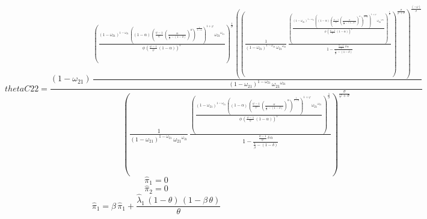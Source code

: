 \begin{dmath*}
thetaC22 = \frac{\left(1-{{\omega_{21}}}\right)\, \frac{\left(\frac{\left(1-{{\omega_{21}}}\right)^{1-{{\omega_{21}}}}\, \left(\left(1-{{\alpha}}\right)\, \left(\frac{{{\psi}}-1}{{{\psi}}}\, \left(\frac{{{\alpha}}}{\frac{1}{{{\beta}}}-\left(1-{{\delta}}\right)}\right)^{{{\alpha}}}\right)^{\frac{1}{1-{{\alpha}}}}\right)^{1+{{\varphi}}}\, {{\omega_{21}}}^{{{\omega_{21}}}}}{{{\phi}}\, \left(\frac{{{\psi}}-1}{{{\psi}}}\, \left(1-{{\alpha}}\right)\right)^{{{\varphi}}}}\right)^{\frac{1}{{{\sigma}}}}\, \left(\left(\frac{1}{\left(1-{{\omega_{21}}}\right)^{1-{{\omega_{21}}}}\, {{\omega_{21}}}^{{{\omega_{21}}}}}\, \frac{\left(\frac{\left(1-{{\omega_{21}}}\right)^{1-{{\omega_{21}}}}\, \left(\left(1-{{\alpha}}\right)\, \left(\frac{{{\psi}}-1}{{{\psi}}}\, \left(\frac{{{\alpha}}}{\frac{1}{{{\beta}}}-\left(1-{{\delta}}\right)}\right)^{{{\alpha}}}\right)^{\frac{1}{1-{{\alpha}}}}\right)^{1+{{\varphi}}}\, {{\omega_{21}}}^{{{\omega_{21}}}}}{{{\phi}}\, \left(\frac{{{\psi}}-1}{{{\psi}}}\, \left(1-{{\alpha}}\right)\right)^{{{\varphi}}}}\right)^{\frac{1}{{{\sigma}}}}}{1-\frac{\frac{{{\psi}}-1}{{{\psi}}}\, {{\delta}}\, {{\alpha}}}{\frac{1}{{{\beta}}}-\left(1-{{\delta}}\right)}}\right)^{\frac{{{\sigma}}}{{{\varphi}}+{{\sigma}}}}\right)^{\frac{\left(-{{\varphi}}\right)}{{{\sigma}}}}}{\left(1-{{\omega_{21}}}\right)^{1-{{\omega_{21}}}}\, {{\omega_{21}}}^{{{\omega_{21}}}}}}{\left(\frac{1}{\left(1-{{\omega_{21}}}\right)^{1-{{\omega_{21}}}}\, {{\omega_{21}}}^{{{\omega_{21}}}}}\, \frac{\left(\frac{\left(1-{{\omega_{21}}}\right)^{1-{{\omega_{21}}}}\, \left(\left(1-{{\alpha}}\right)\, \left(\frac{{{\psi}}-1}{{{\psi}}}\, \left(\frac{{{\alpha}}}{\frac{1}{{{\beta}}}-\left(1-{{\delta}}\right)}\right)^{{{\alpha}}}\right)^{\frac{1}{1-{{\alpha}}}}\right)^{1+{{\varphi}}}\, {{\omega_{21}}}^{{{\omega_{21}}}}}{{{\phi}}\, \left(\frac{{{\psi}}-1}{{{\psi}}}\, \left(1-{{\alpha}}\right)\right)^{{{\varphi}}}}\right)^{\frac{1}{{{\sigma}}}}}{1-\frac{\frac{{{\psi}}-1}{{{\psi}}}\, {{\delta}}\, {{\alpha}}}{\frac{1}{{{\beta}}}-\left(1-{{\delta}}\right)}}\right)^{\frac{{{\sigma}}}{{{\varphi}}+{{\sigma}}}}}
\end{dmath*}
\begin{dmath}
{{\hat{\pi}_{1}}}=0
\end{dmath}
\begin{dmath}
{{\hat{\pi}_{2}}}=0
\end{dmath}
\begin{dmath}
{{\hat{\pi}_{1}}}={{\beta}}\, {{\hat{\pi}_{1}}}+\frac{{{\hat{\lambda}_{1}}}\, \left(1-{{\theta}}\right)\, \left(1-{{\beta}}\, {{\theta}}\right)}{{{\theta}}}
\end{dmath}
